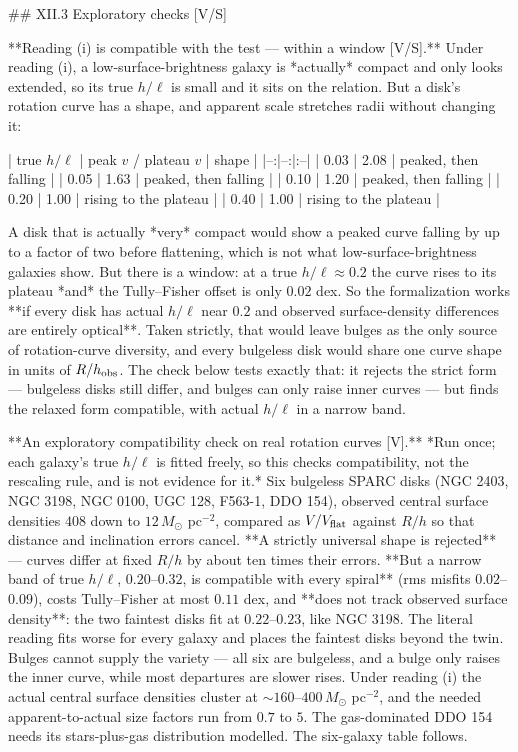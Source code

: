 ## XII.3 Exploratory checks [V/S]

**Reading (i) is compatible with the test — within a window [V/S].** Under reading (i), a low-surface-brightness galaxy is *actually* compact and only looks extended, so its true $h/\ell$ is small and it sits on the relation. But a disk's rotation curve has a shape, and apparent scale stretches radii without changing it:

| true $h/\ell$ | peak $v$ / plateau $v$ | shape |
|--:|--:|:--|
| 0.03 | 2.08 | peaked, then falling |
| 0.05 | 1.63 | peaked, then falling |
| 0.10 | 1.20 | peaked, then falling |
| 0.20 | 1.00 | rising to the plateau |
| 0.40 | 1.00 | rising to the plateau |

A disk that is actually *very* compact would show a peaked curve falling by up to a factor of two before flattening, which is not what low-surface-brightness galaxies show. But there is a window: at a true $h/\ell\approx0.2$ the curve rises to its plateau *and* the Tully–Fisher offset is only $0.02$ dex. So the formalization works **if every disk has actual $h/\ell$ near $0.2$ and observed surface-density differences are entirely optical**. Taken strictly, that would leave bulges as the only source of rotation-curve diversity, and every bulgeless disk would share one curve shape in units of $R/h_{\rm obs}$. The check below tests exactly that: it rejects the strict form — bulgeless disks still differ, and bulges can only raise inner curves — but finds the relaxed form compatible, with actual $h/\ell$ in a narrow band.

**An exploratory compatibility check on real rotation curves [V].** *Run once; each galaxy's true $h/\ell$ is fitted freely, so this checks compatibility, not the rescaling rule, and is not evidence for it.* Six bulgeless SPARC disks (NGC 2403, NGC 3198, NGC 0100, UGC 128, F563-1, DDO 154), observed central surface densities $408$ down to $12\,M_\odot$ pc$^{-2}$, compared as $V/V_{\rm flat}$ against $R/h$ so that distance and inclination errors cancel. **A strictly universal shape is rejected** — curves differ at fixed $R/h$ by about ten times their errors. **But a narrow band of true $h/\ell$, $0.20$–$0.32$, is compatible with every spiral** (rms misfits $0.02$–$0.09$), costs Tully–Fisher at most $0.11$ dex, and **does not track observed surface density**: the two faintest disks fit at $0.22$–$0.23$, like NGC 3198. The literal reading fits worse for every galaxy and places the faintest disks beyond the twin. Bulges cannot supply the variety — all six are bulgeless, and a bulge only raises the inner curve, while most departures are slower rises. Under reading (i) the actual central surface densities cluster at $\sim160$–$400\,M_\odot$ pc$^{-2}$, and the needed apparent-to-actual size factors run from $0.7$ to $5$. The gas-dominated DDO 154 needs its stars-plus-gas distribution modelled. The six-galaxy table follows.

